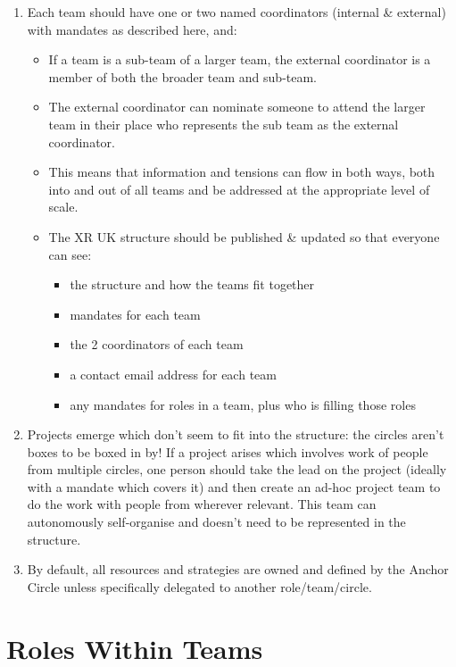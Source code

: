 \documentclass[12pt,a4paper,oneside]{article}
\begin{document}
\begin{enumerate}
\item
  Each team should have one or two named coordinators (internal \& external)
  with mandates as described here, and: %
  \begin{itemize}
  \item
    If a team is a sub-team of a larger team, the external coordinator is a
    member of both the broader team and sub-team.
  \item
    The external coordinator can nominate someone to attend the larger team in
    their place who represents the sub team as the external coordinator.
  \item
    This means that information and tensions can flow in both ways, both into
    and out of all teams and be addressed at the appropriate level of scale.
  \item
    The XR UK structure should be published \& updated so that everyone can see:
    \begin{itemize}
    \item the structure and how the teams fit together
    \item mandates for each team
    \item the 2 coordinators of each team
    \item a contact email address for each team
    \item any mandates for roles in a team, plus who is filling those roles
    \end{itemize}
  \end{itemize}

\item
  Projects emerge which don’t seem to fit into the structure: the circles aren’t
  boxes to be boxed in by! If a project arises which involves work of people
  from multiple circles, one person should take the lead on the project (ideally
  with a mandate which covers it) and then create an ad-hoc project team to do
  the work with people from wherever relevant. This team can autonomously
  self-organise and doesn’t need to be represented in the structure.

\item
  By default, all resources and strategies are owned and defined by the Anchor
  Circle unless specifically delegated to another role/team/circle.
\end{enumerate}

\section{Roles Within Teams}
\end{document}
